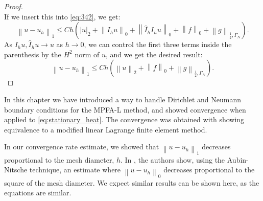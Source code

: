 \documentclass[../Main/main.tex]{subfiles}
\begin{document}
\begin{proof}
\begin{equation}
	\end{equation}
	If we insert this into \eqref{eq:342}, we get:
	\begin{equation}
	\left \| u - u_h \right \|_1 \leq  Ch \left ( |u|_2 + \left \| I_h u\right \|_0 + \left \| \hat{I}_h I_h u \right \|_0 + \left \| f \right \|_0 + \left \| g \right \|_{\frac{1}{2},\Gamma_N} \right ).
	\end{equation}
	As $I_h u, \hat{I}_h u \rightarrow u$ as $h\rightarrow 0$, we can control the first three terms inside the parenthesis by the $H^2$ norm of $u$, and we get the desired result:
	\begin{equation}
\left \| u - u_h \right \|_1 \leq  Ch \left ( \left \|u\right \|_2 + \left \| f \right \|_0 + \left \| g \right \|_{\frac{1}{2},\Gamma_N} \right ).	\end{equation}
	\end{proof}
	In this chapter we have introduced a way to handle Dirichlet and Neumann boundary conditions for the MPFA-L method, and showed convergence when applied to \eqref{eq:stationary_heat}. The convergence was obtained with showing equivalence to a modified linear Lagrange finite element method.
	\begin{remark}\label{rem:l2_remark}
		In our convergence rate estimate, we showed that $\left \|u-u_h\right \|_1$ decreases proportional to the mesh diameter, $h$. In \cite{https://doi.org/10.1002/num.20525}, the authors show, using the Aubin-Nitsche technique, an estimate where $\left \|u-u_h\right \|_0$ decreases proportional to the square of the mesh diameter. We expect similar results can be shown here, as the equations are similar.
	\end{remark}
\end{document}
